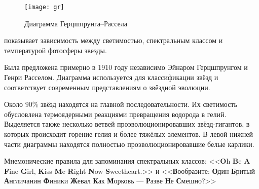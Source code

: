 \begin{figure}[h!]
	\centering
	\vspace{-1pc}
	\texttt{[image: gr]}
 	\caption{Диаграмма Герцшпрунга--Рассела}
 	\label{pic:d-cep}
\end{figure}
 показывает зависимость между светимостью, спектральным классом и температурой фотосферы звезды.

Была предложена примерно в 1910 году независимо Эйнаром Герцшпрунгом и Генри Расселом. Диаграмма используется для классификации звёзд и соответствует современным представлениям о звёздной эволюции.

Около $90 \%$ звёзд находятся на главной последовательности. Их светимость обусловлена термоядерными реакциями превращения водорода в гелий. Выделяется также несколько ветвей проэволюционировавших звёзд-гигантов, в которых происходит горение гелия и более тяжёлых элементов. В левой нижней части диаграммы находятся полностью проэволюционировавшие белые карлики.

Мнемонические правила для запоминания спектральных классов: <<\textbf{O}h \textbf{B}e \textbf{A} \textbf{F}ine \textbf{G}irl, \textbf{K}iss \textbf{M}e \textbf{R}ight \textbf{N}ow \textbf{S}weetheart.>> и <<\textbf{В}ообразите: \textbf{О}дин \textbf{Б}ритый \textbf{А}нгличанин \textbf{Ф}иники \textbf{Ж}евал \textbf{К}ак \textbf{М}орковь --- \textbf{Р}азве \textbf{Н}е \textbf{С}мешно?>>

